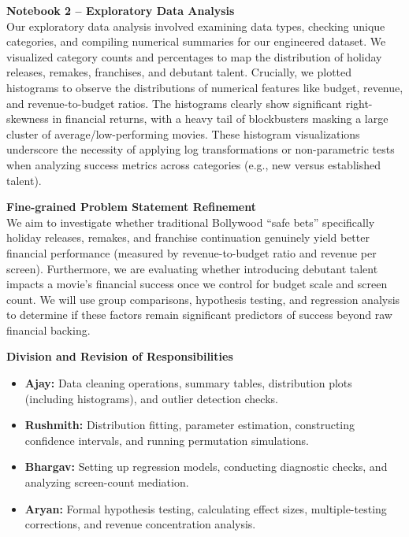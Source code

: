 \documentclass[10pt,a4paper]{article}
\begin{document}
\textbf{Notebook 2 -- Exploratory Data Analysis}\\
Our exploratory data analysis involved examining data types, checking unique categories, and compiling numerical summaries
for our engineered dataset. We visualized category counts and percentages to map the distribution of holiday releases,
remakes, franchises, and debutant talent. Crucially, we plotted histograms to observe the distributions of numerical features
like budget, revenue, and revenue-to-budget ratios. The histograms clearly show significant right-skewness in financial returns,
with a heavy tail of blockbusters masking a large cluster of average/low-performing movies. These histogram visualizations
underscore the necessity of applying log transformations or non-parametric tests when analyzing success metrics across
categories (e.g., new versus established talent).

\textbf{Fine-grained Problem Statement Refinement}\\
We aim to investigate whether traditional Bollywood “safe bets” specifically holiday releases, remakes, and franchise
continuation genuinely yield better financial performance (measured by revenue-to-budget ratio and revenue per screen).
Furthermore, we are evaluating whether introducing debutant talent impacts a movie’s financial success once we control for
budget scale and screen count. We will use group comparisons, hypothesis testing, and regression analysis to determine if
these factors remain significant predictors of success beyond raw financial backing.

\textbf{Division and Revision of Responsibilities}
\vspace{-5pt}
\begin{itemize}
    \setlength{\itemsep}{0pt}
    \setlength{\parskip}{0pt}
    \setlength{\parsep}{0pt}
    \item \textbf{Ajay:} Data cleaning operations, summary tables, distribution plots (including histograms), and outlier detection checks.
    \item \textbf{Rushmith:} Distribution fitting, parameter estimation, constructing confidence intervals, and running permutation simulations.
    \item \textbf{Bhargav:} Setting up regression models, conducting diagnostic checks, and analyzing screen-count mediation.
    \item \textbf{Aryan:} Formal hypothesis testing, calculating effect sizes, multiple-testing corrections, and revenue concentration analysis.
\end{itemize}
\vspace{-6pt}
\end{document}
